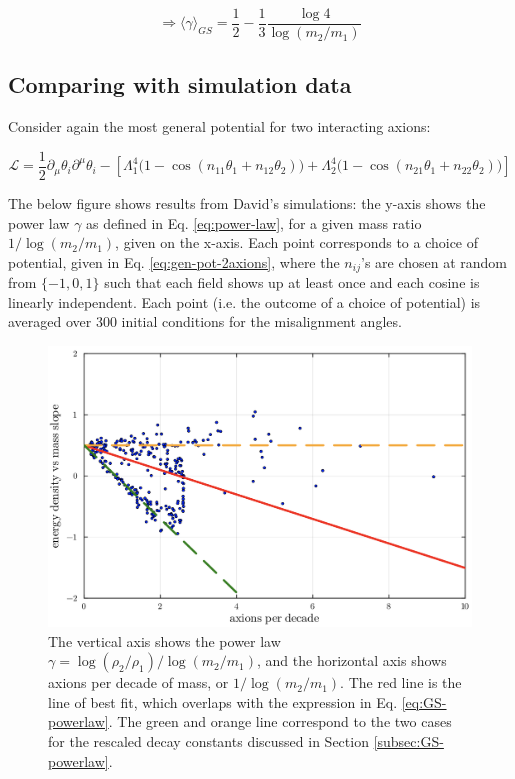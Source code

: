 \documentclass[11pt]{article}
\begin{document}
\begin{equation}
    \label{eq:GS-powerlaw}
    \Rightarrow \langle \gamma\rangle_{GS}  = \frac{1}{2}-\frac{1}{3}\frac{\log{4}}{\log{(m_2/m_1)}}
\end{equation}

\subsection{Comparing with simulation data}

Consider again the most general potential for two interacting axions:

\begin{equation}
    \label{eq:gen-pot-2axions}
    \mathcal{L} = \frac{1}{2}\partial_\mu\theta_i\partial^\mu\theta_i-\left[\Lambda_1^4\big(1-\cos{(n_{11}\theta_1+n_{12}\theta_2)}\big) +\Lambda_2^4\big(1-\cos{(n_{21}\theta_1+n_{22}\theta_2)}\big)\right]
\end{equation}

The below figure shows results from David's simulations: the y-axis shows the power law $\gamma$ as defined in Eq. \eqref{eq:power-law}, for a given mass ratio $1/\log{(m_2/m_1)}$, given on the x-axis. Each point corresponds to a choice of potential, given in Eq. \eqref{eq:gen-pot-2axions}, where the $n_{ij}$'s are chosen at random from $\{-1,0,1\}$ such that each field shows up at least once and each cosine is linearly independent. Each point (i.e. the outcome of a choice of potential) is averaged over 300 initial conditions for the misalignment angles. 

\begin{figure}[h]
    \centering
    \includegraphics[width=0.9\linewidth]{figs/Slope_vs_ApD.png}
    \caption{The vertical axis shows the power law $\gamma = \log(\rho_2/\rho_1)/\log{(m_2/m_1)}$, and the horizontal axis shows axions per decade of mass, or $1/\log{(m_2/m_1)}$. The red line is the line of best fit, which overlaps with the expression in Eq. \eqref{eq:GS-powerlaw}. The green and orange line correspond to the two cases for the rescaled decay constants discussed in Section \ref{subsec:GS-powerlaw}.}
    \label{fig:2axions-powerlaw-apd}
\end{figure}
\end{document}
